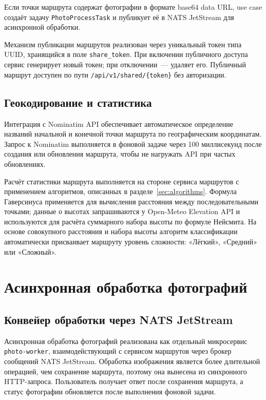 Если точки маршрута содержат фотографии в формате base64 data URL, use case создаёт задачу \texttt{PhotoProcessTask} и публикует её в NATS JetStream для асинхронной обработки.

Механизм публикации маршрутов реализован через уникальный токен типа UUID, хранящийся в поле \texttt{share\_token}. При включении публичного доступа сервис генерирует новый токен; при отключении~--- удаляет его. Публичный маршрут доступен по пути \texttt{/api/v1/shared/\{token\}} без авторизации.

\subsection{Геокодирование и статистика}

Интеграция с Nominatim API обеспечивает автоматическое определение названий начальной и конечной точки маршрута по географическим координатам. Запрос к Nominatim выполняется в фоновой задаче через 100 миллисекунд после создания или обновления маршрута, чтобы не нагружать API при частых обновлениях.

Расчёт статистики маршрута выполняется на стороне сервиса маршрутов с применением алгоритмов, описанных в разделе~\ref{sec:algorithms}. Формула Гаверсинуса применяется для вычисления расстояния между последовательными точками; данные о высотах запрашиваются у Open-Meteo Elevation API и используются для расчёта суммарного набора высоты по формуле Нейсмита. На основе совокупного расстояния и набора высоты алгоритм классификации автоматически присваивает маршруту уровень сложности: «Лёгкий», «Средний» или «Сложный».

\section{Асинхронная обработка фотографий}
\label{sec:photo-processing-implementation}

\subsection{Конвейер обработки через NATS JetStream}

Асинхронная обработка фотографий реализована как отдельный микросервис
\texttt{photo-worker}, взаимодействующий с сервисом маршрутов через брокер
сообщений NATS JetStream. Обработка изображения является более длительной
операцией, чем сохранение маршрута, поэтому она вынесена из синхронного
HTTP-запроса. Пользователь получает ответ после сохранения маршрута, а статус
фотографии обновляется после выполнения фоновой задачи.

